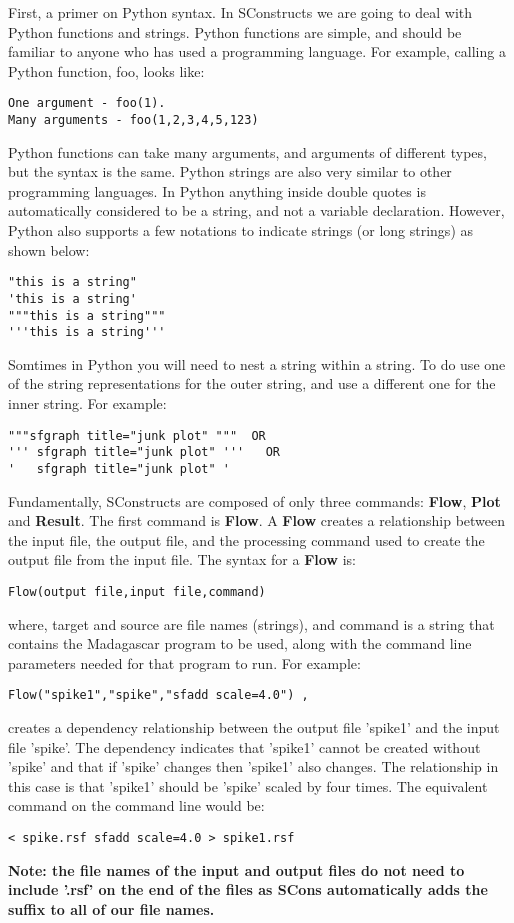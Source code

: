 First, a primer on Python syntax.  In SConstructs we are going to deal with Python functions and strings.  Python functions are simple, and should be familiar to anyone who has used a programming language.  For example, calling a Python function, foo, looks like:
\begin{verbatim}
One argument - foo(1).
Many arguments - foo(1,2,3,4,5,123)
\end{verbatim}
Python functions can take many arguments, and arguments of different types, but the syntax is the same.  Python strings are also very similar to other programming languages.  In Python anything inside double quotes is automatically considered to be a string, and not a variable declaration.  However, Python also supports a few  notations to indicate strings (or long strings) as shown below:
\begin{verbatim}
"this is a string"
'this is a string'
"""this is a string"""
'''this is a string'''
\end{verbatim}
Somtimes in Python you will need to nest a string within a string.  To do use one of the string representations for the outer string, and use a different one for the inner string.  For example:
\begin{verbatim}
"""sfgraph title="junk plot" """  OR
''' sfgraph title="junk plot" '''   OR
'   sfgraph title="junk plot" ' 
\end{verbatim}

Fundamentally, SConstructs are composed of only three commands: \textbf{Flow}, \textbf{Plot} and \textbf{Result}.  The first command is \textbf{Flow}.  A \textbf{Flow} creates a relationship between the input file, the output file, and the processing command used to create the output file from the input file.  The syntax for a \textbf{Flow} is:

\begin{verbatim}
Flow(output file,input file,command)
\end{verbatim}
where, target and source are file names (strings), and command is a string that contains the Madagascar program to be used, along with the command line parameters needed for that program to run.  For example:
\begin{verbatim}
Flow("spike1","spike","sfadd scale=4.0") ,
\end{verbatim}
creates a dependency relationship between the output file 'spike1' and the input file 'spike'.  The dependency indicates that 'spike1' cannot be created without 'spike' and that if 'spike' changes then 'spike1' also changes.  The relationship in this case is that 'spike1' should be 'spike' scaled by four times.  The equivalent command on the command line would be: 
\begin{verbatim}
< spike.rsf sfadd scale=4.0 > spike1.rsf
\end{verbatim}
\textbf{Note: the file names of the input and output files do not need to include '.rsf' on the end of the files as SCons automatically adds the suffix to all of our file names.}

